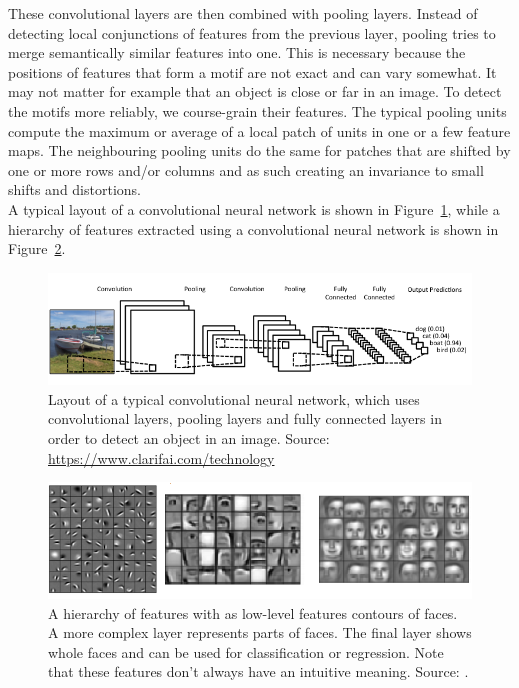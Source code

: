 \documentclass[a4paper, 11pt]{article}
\begin{document}
These convolutional layers are then combined with pooling layers. Instead of detecting local conjunctions of features from the previous layer, pooling tries to merge semantically similar features into one. This is necessary because the positions of features that form a motif are not exact and can vary somewhat. It may not matter for example that an object is close or far in an image.
To detect the motifs more reliably, we course-grain their features. The typical pooling units compute the maximum or average of a local patch of units in one or a few feature maps. The neighbouring pooling units do the same for patches that are shifted by one or more rows and/or columns and as such creating an invariance to small shifts and distortions.\\
A typical layout of a convolutional neural network is shown in Figure~\ref{fig:cnnlayout}, while a hierarchy of features extracted using a convolutional neural network is shown in Figure~\ref{fig:cnnfeatures}.\\
\begin{figure}[htb]
    \centering
    \includegraphics[width=\linewidth]{images/cnnlayout.png}
    \caption[Convolutional neural network layout]{Layout of a typical convolutional neural network, which uses convolutional layers, pooling layers and fully connected layers in order to detect an object in an image. Source: \url{https://www.clarifai.com/technology}}
    \label{fig:cnnlayout}
\end{figure}
\begin{figure}[htb]
    \centering
    \includegraphics[width=\linewidth]{images/cnnfeatures.png}
    \caption[Convolutional neural network features hierarchy]{A hierarchy of features with as low-level features contours of faces. A more complex layer represents parts of faces. The final layer shows whole faces and can be used for classification or regression. Note that these features don't always have an intuitive meaning. Source: \cite{conf/icml/LeeGRN09}.}
    \label{fig:cnnfeatures}
\end{figure}
\end{document}
